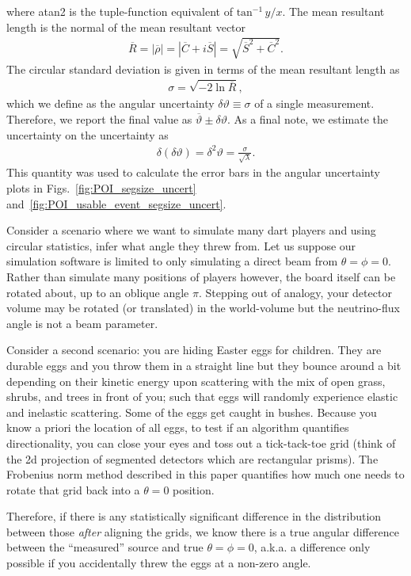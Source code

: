 \documentclass[tightenlines,twocolumn,prl,notitlepage,nofootinbib,preprintnumbers,longbibliography]{revtex4-1}
\begin{document}
where atan2 is the tuple-function equivalent of $\text{tan}^{-1}\, {y/x} $.
The mean resultant length is the normal of the mean resultant vector
\begin{align}
\overline R=|\overline \rho|=\left|\overline C + i\overline S\right|=\sqrt{\overline S^2 + \overline C^2}.
\end{align}
The circular standard deviation is given in terms of the mean resultant length as
\begin{align}
\sigma=\sqrt{-2 \ln\overline R},
\end{align}
which we define as the angular uncertainty $\delta \vartheta\equiv\sigma$ of a single measurement. 
Therefore, we report the final value as $\overline\vartheta\pm\delta\vartheta$. As a final note, we estimate the uncertainty on the uncertainty as
\begin{align}
\delta(\delta \vartheta)=\delta^2\vartheta=\frac{\sigma}{\sqrt{\lambda}}.
\end{align}
This quantity was used to calculate the error bars in the angular uncertainty plots in Figs.~\ref{fig:POI_segsize_uncert} and~\ref{fig:POI_usable_event_segsize_uncert}.

Consider a scenario where we want to simulate many dart players and using circular statistics, infer what angle they threw from. Let us suppose our simulation software is limited to only simulating a direct beam from $\theta = \phi = 0$. Rather than simulate many positions of players however, the board itself can be rotated about, up to an oblique angle $\pi$. 
Stepping out of analogy, your detector volume may be rotated (or translated) in the world-volume but the neutrino-flux angle is not a beam parameter.

Consider a second scenario: you are hiding Easter eggs for children. They are durable eggs and you throw them in a straight line but they bounce around a bit depending on their kinetic energy upon scattering with the mix of open grass, shrubs, and trees in front of you; such that eggs will randomly experience elastic and inelastic scattering. Some of the eggs get caught in bushes. Because you know a priori the location of all eggs, to test if an algorithm quantifies directionality, you can close your eyes and toss out a tick-tack-toe grid (think of the 2d projection of segmented detectors which are rectangular prisms). The Frobenius norm method described in this paper quantifies how much one needs to rotate that grid back into a $\theta = 0$ position.

Therefore, if there is any statistically significant difference in the distribution between those \textit{after} aligning the grids, we know there is a true angular difference between the ``measured'' source and true $\theta = \phi = 0$, a.k.a. a difference only possible if you accidentally threw the eggs at a non-zero angle. 
\end{document}
